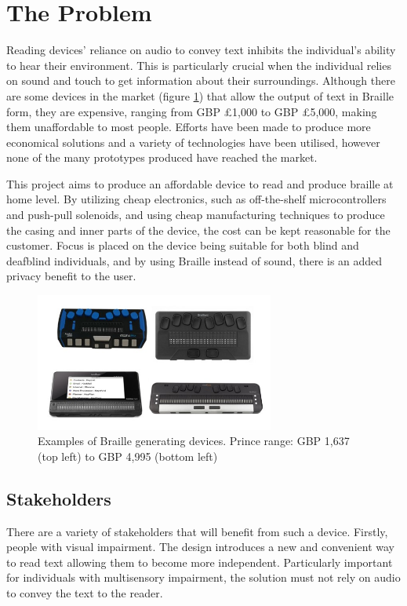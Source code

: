 \section{The Problem}
Reading devices' reliance on audio to convey text inhibits the individual's ability to hear their environment.
This is particularly crucial when the individual relies on sound and touch to get information about their surroundings.
Although there are some devices in the market (figure \ref{fig:braille-readers-examples}) that allow the output of text in Braille form, they are expensive, ranging from GBP £1,000 to GBP £5,000, making them unaffordable to most people.
Efforts have been made to produce more economical solutions and a variety of technologies have been utilised, however none of the many prototypes produced have reached the market.

This project aims to produce an affordable device to read and produce braille at home level.
By utilizing cheap electronics, such as off-the-shelf microcontrollers and push-pull solenoids, and using cheap manufacturing techniques to produce the casing and inner parts of the device, the cost can be kept reasonable for the customer.
Focus is placed on the device being suitable for both blind and deafblind individuals, and by using Braille instead of sound, there is an added privacy benefit to the user.
\begin{figure}[h]
\centering
    \includegraphics[width=0.7\textwidth]{figures/braille-readers-examples.jpg}
\caption[Examples of Braille generating devices]{Examples of Braille generating devices. Prince range: GBP 1,637 (top left) to GBP 4,995 (bottom left)}
\label{fig:braille-readers-examples}
\end{figure}

\subsection{Stakeholders}
There are a variety of stakeholders that will benefit from such a device.
Firstly, people with visual impairment.
The design introduces a new and convenient way to read text allowing them to become more independent.
Particularly important for individuals with multisensory impairment, the solution must not rely on audio to convey the text to the reader.


